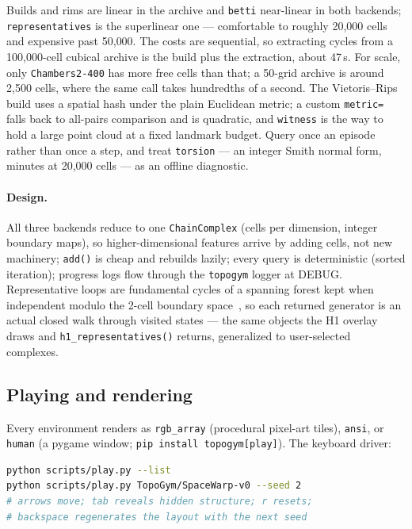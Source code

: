 \documentclass[11pt]{article}
\begin{document}
\noindent Builds and rims are linear in the archive and
\texttt{betti} near-linear in both backends; \texttt{representatives}
is the superlinear one --- comfortable to roughly 20{,}000 cells and
expensive past 50{,}000. The costs are sequential, so extracting
cycles from a 100{,}000-cell cubical archive is the build plus the
extraction, about 47\,s. For scale, only \texttt{Chambers2-400} has
more free cells than that; a 50-grid archive is around 2{,}500 cells,
where the same call takes hundredths of a second. The Vietoris--Rips
build uses a spatial hash under the plain Euclidean metric; a custom
\texttt{metric=} falls back to all-pairs comparison and is quadratic,
and \texttt{witness} is the way to hold a large point cloud at a
fixed landmark budget. Query once an episode rather than once a step,
and treat \texttt{torsion} --- an integer Smith normal form, minutes
at 20{,}000 cells --- as an offline diagnostic.

\paragraph{Design.} All three backends reduce to one
\texttt{ChainComplex} (cells per dimension, integer boundary maps),
so higher-dimensional features arrive by adding cells, not new
machinery; \texttt{add()} is cheap and rebuilds lazily; every query
is deterministic (sorted iteration); progress logs flow through the
\texttt{topogym} logger at DEBUG. Representative loops are
fundamental cycles of a spanning forest kept when independent modulo
the 2-cell boundary space~\cite{zomorodian05}, so each returned
generator is an actual closed walk through visited states --- the
same objects the H1 overlay draws and \texttt{h1\_representatives()}
returns, generalized to user-selected complexes.

\subsection{Playing and rendering}

Every environment renders as \texttt{rgb\_array} (procedural
pixel-art tiles), \texttt{ansi}, or \texttt{human} (a pygame window;
\texttt{pip install topogym[play]}). The keyboard driver:

\begin{lstlisting}[language=bash]
python scripts/play.py --list
python scripts/play.py TopoGym/SpaceWarp-v0 --seed 2
# arrows move; tab reveals hidden structure; r resets;
# backspace regenerates the layout with the next seed
\end{lstlisting}
\end{document}
